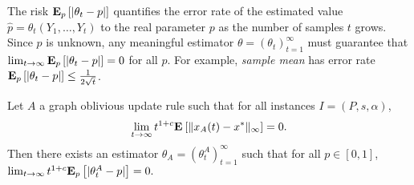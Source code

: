 The risk $\bm{\mathrm{E}}_{p} \left[ |\theta_t - p| \right]$ quantifies the error rate of
the estimated value $\hat{p} =\theta_t(Y_1,\ldots,Y_t)$ to the
real parameter $p$ as the number of samples $t$ grows.
Since $p$ is unknown, any meaningful estimator $\theta=(\theta_t)_{t=1}^\infty$
must guarantee that $\lim_{t \to \infty} \bm{\mathrm{E}}_{p} \left[ |\theta_t - p| \right]=0$ for all $p$.
For example, \emph{sample mean} has error rate
$\bm{\mathrm{E}}_{p} \left[ |\theta_t-p| \right] \leq \frac{1}{2\sqrt{t}}$.

\begin{lemma}\label{l:reduction}
  Let $A$ a graph oblivious update rule such that for all instances $I=(P,s,\alpha)$,
  \[\lim_{t \rightarrow \infty} t^{1+c}
  \bm{\mathrm{E}}_{} \left[ \| x_A(t)-x^* \|_{\infty} \right]=0.\]
  Then there exists an estimator $\theta_A=(\theta_t^A)_{t=1}^\infty$ such that for all
  $p \in [0,1]$,
  \(\lim_{t \rightarrow \infty}t^{1+c}\bm{\mathrm{E}}_{p} \left[ |\theta_t^A-p| \right]=0.\)
\end{lemma}
